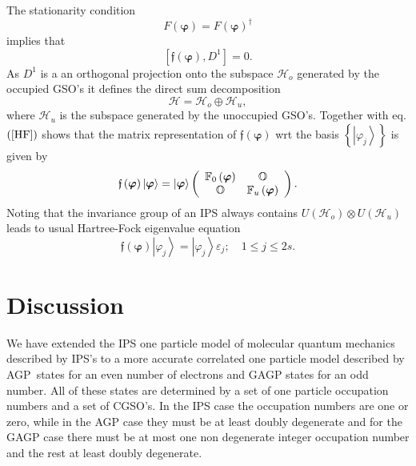 \documentclass[aps,preprint]{revtex4}%
\begin{document}
The stationarity condition
\begin{equation}
F\left(  \bm{\varphi}\right)  =F\left(  \bm{\varphi}\right)  ^{\dagger}%
\end{equation}
implies that
\begin{equation}
\left[  \mathfrak{f}\left(  \bm{\varphi}\right)  ,D^{1}\right]  =0. \label{HF}%
\end{equation}
As $D^{1}$ is a an orthogonal projection onto the subspace $\mathcal{H}_{o}$
generated by the occupied GSO's it defines the direct sum decomposition
\begin{equation}
\mathcal{H=H}_{o}\oplus\mathcal{H}_{u}, \label{DS}%
\end{equation}
where $\mathcal{H}_{u}$ is the subspace generated by the unoccupied GSO's.
Together with eq. $\left(  \ref{HF}\right)  $ shows that the matrix
representation of $\mathfrak{f}\left(  \bm{\varphi}\right)  $ wrt the basis
$\left\{  \left\vert \varphi_{j}\right\rangle \right\}  $ is given by
\begin{equation}
\mathfrak{f}\left(  \bm{\varphi}\right)  \left\vert \bm{\varphi }\right\rangle
=\left\vert \bm{\varphi}\right\rangle \left(
\begin{array}
[c]{cc}%
\mathbb{F}_{0}\left(  \bm{\varphi}\right)  & \mathbb{O}\\
\mathbb{O} & \mathbb{F}_{u}\left(  \bm{\varphi}\right)
\end{array}
\right)  .
\end{equation}
Noting that the invariance group of an IPS always contains $U\left(
\mathcal{H}_{o}\right)  \otimes U\left(  \mathcal{H}_{u}\right)  $ leads to
usual Hartree-Fock eigenvalue equation
\begin{equation}
\mathfrak{f}\left(  \bm{\varphi}\right)  \left\vert \varphi_{j}\right\rangle
=\left\vert \varphi_{j}\right\rangle \varepsilon_{j};\quad1\leq j\leq2s.
\end{equation}


\section{Discussion\label{Discussion}}

We have extended the IPS one particle model of molecular quantum mechanics
described by IPS's to a more accurate correlated one particle model described
by AGP\ states for an even number of electrons and GAGP states for an odd
number. All of these states are determined by a set of one particle occupation
numbers and a set of CGSO's. In the IPS case the occupation numbers are one or
zero, while in the AGP case they must be at least doubly degenerate and for
the GAGP case there must be at most one non degenerate integer occupation
number and the rest at least doubly degenerate.
\end{document}
